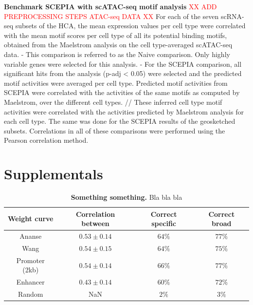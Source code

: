 \textbf{Benchmark SCEPIA with scATAC-seq motif analysis}
\textcolor{red}{XX ADD PREPROCESSING STEPS ATAC-seq DATA XX} For each of the seven scRNA-seq subsets of the HCA, the mean expression values per cell type were correlated with the mean motif scores per cell type of all its potential binding motifs, obtained from the Maelstrom analysis on the cell type-averaged scATAC-seq data. 
- This comparison is referred to as the Naive comparison. Only highly variable genes were selected for this analysis. 
- For the SCEPIA comparison, all significant hits from the analysis (p-adj < 0.05) were selected and the predicted motif activities were averaged per cell type. Predicted motif activities from SCEPIA were correlated with the activities of the same motifs as computed by Maelstrom, over the different cell types. // These inferred cell type motif activities were correlated with the activities predicted by Maelstrom analysis for each cell type. The same was done for the SCEPIA results of the geosketched subsets. Correlations in all of these comparisons were performed using the Pearson correlation method.

\section{Supplementals}
\beginsupplement
\begin{table}
    \begin{center}
        \begin{tabular}{||c c c c||} 
        \hline
        Weight curve & Correlation between & Correct specific & Correct broad \\[0.5ex] 
        \hline
        Ananse\cite{Xu_2020}& $0.53 \pm 0.14$ & $64\%$ & $77\%$ \\ 
        \hline
        Wang\cite{Wang2016} & $0.54 \pm 0.15 $ & $64\%$ & $75\%$ \\
        \hline
        Promoter (2kb) & $0.54 \pm 0.14$ & $66\%$ & $77\%$ \\
        \hline
        Enhancer & $0.43 \pm 0.14$ & $60\%$ & $72\%$ \\
        \hline
        Random & NaN & $2\%$ & $3\%$ \\
        \hline
        \end{tabular}
        \caption{\textbf{Something something.} Bla bla bla}
        \label{table:correlations}
    \end{center}
\end{table}

